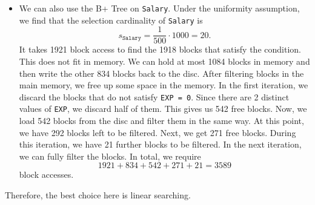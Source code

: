 \documentclass[a4paper, openany]{memoir}
\theoremstyle{definition}
\begin{document}
\begin{answer}
\begin{itemize}
\begin{itemize}
            \item We can also use the B+ Tree on \texttt{Salary}. Under the uniformity assumption, we find that the selection cardinality of \texttt{Salary} is
            \[s_{\texttt{Salary}} = \frac{1}{500} \cdot 1000 = 20.\]
            It takes 1921 block access to find the 1918 blocks that satisfy the condition. This does not fit in memory. We can hold at most 1084 blocks in memory and then write the other 834 blocks back to the disc. After filtering blocks in the main memory, we free up some space in the memory. In the first iteration, we discard the blocks that do not satisfy \texttt{EXP = 0}. Since there are 2 distinct values of \texttt{EXP}, we discard half of them. This gives us 542 free blocks. Now, we load 542 blocks from the disc and filter them in the same way. At this point, we have 292 blocks left to be filtered. Next, we get 271 free blocks. During this iteration, we have 21 further blocks to be filtered. In the next iteration, we can fully filter the blocks. In total, we require
            \[1921 + 834 + 542 + 271 + 21 = 3589\]
            block accesses.
        \end{itemize}
    \end{itemize}
    Therefore, the best choice here is linear searching. 
\end{answer}
\newpage
\end{document}
